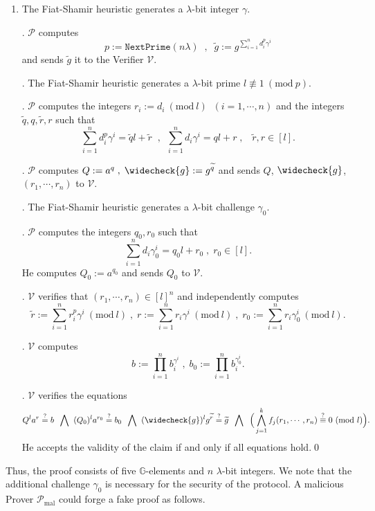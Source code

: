\documentclass[11pt, lettersize, notitlepage, leqno, footskip=0.6cm]{article}
\newcommand{\pl}{\prod\limits}
\newcommand{\slim}{\sum\limits}
\newcommand{\ttt}{\texttt}
\newcommand{\wti}{\widetilde}
\newcommand{\mc}{\mathcal}
\newcommand{\mb}{\mathbb}
\newcommand{\mr}{\mathrm}
\newcommand{\lam}{\lambda}
\newcommand{\weck}{\widecheck}
\newcommand{\mP}{\mc{P}}
\newcommand{\V}{\mc{V}}
\newcommand{\vs}{\vspace{-0.15cm}}
\newcommand{\noin}{\noindent}
\newcommand{\sta}{\stackrel{?}{=}}
\newcommand{\Mod}[1]{\ (\mathrm{mod}\ #1)}
\numberwithin{equation}{section}
\begin{document}
\begin{enumerate}[wide, labelwidth=!, labelindent=0pt]\vs \item The Fiat-Shamir heuristic generates a $\lam$-bit integer $\gamma$.

. $\mc{P}$ computes \vs $$p:= \ttt{NextPrime}(n\lam)\;\;,\;\;\wti{g} :=g^{\sum\limits_{i=1}^n d_i^{p}\gamma^i}$$ and sends $\wti{g}$ it to the Verifier $\mc{V}$.

. The Fiat-Shamir heuristic generates a $\lam$-bit prime $l\not\equiv 1\Mod{p}$.
 
. $\mc{P}$ computes the integers $r_i:=d_i\Mod{l}\;\; (i=1,\cdots, n)$ and the integers $\wti{q}, q, \wti{r}, r$ such that \vs $$\slim_{i=1}^n d_i^{p}\gamma^i = \wti{q}l+\wti{r}\;\;,\:\;\slim_{i=1}^n d_i\gamma^i = ql+r\;,\;\;\;\wti{r}, r\in [l] .$$

\noin 5. $\mP$ computes $Q:= a^q\;,\;\weck{g}:= g^{\wti{q}}$ and sends $Q$, $\weck{g}$, $(r_1,\cdots,r_n)$ to  $\V$. 

\noin 6. The Fiat-Shamir heuristic generates a $\lam$-bit challenge $\gamma_0$.

\noin 7. $\mP$ computes the integers $q_0, r_0$ such that \vs $$\slim_{i=1}^n d_i\gamma_0^i = q_0l+r_0\;,\;r_0\in[l] .$$ He computes $Q_0:= a^{q_{0}}$ and sends $Q_0$ to $\V$.

. $\mc{V}$ verifies that $(r_1,\cdots,r_n)\in [l]^n$ and independently computes \vs $$\wti{r}:= \slim_{i=1}^n r_i^{p}\gamma^i\Mod{l}\;,\;r:= \slim_{i=1}^n r_i\gamma^i\Mod{l}\;,\;r_0:= \slim_{i=1}^n r_i\gamma_0^i\Mod{l}.$$

\noin 9. $\V$ computes \vs $$b:= \pl_{i=1}^n b_i^{\gamma^i}\;,\;b_0:= \pl_{i=1}^n b_i^{\gamma_0^i}.$$

. $\mc{V}$ verifies the equations \vs $$ Q^{l} a^{r} \sta b \;\;\bigwedge\;\;(Q_0)^{l} a^{r_{0}} \sta b_0 \;\;\bigwedge\;\; (\weck{g})^lg^{\wti{r}} \stackrel{?}{=}\wti{g} \;\;\bigwedge\;\;\Big( \bigwedge\limits_{j=1}^k  f_j(r_1,\cdots,r_n) \stackrel{?}{\equiv} 0\Mod{l} \Big).$$ He accepts the validity of the claim if and only if all equations hold.\qed \end{enumerate}


\vspace{0.1cm}

Thus, the proof consists of five $\mb{G}$-elements and $n$ $\lam$-bit integers. We note that the additional challenge $\gamma_0$ is necessary for the security of the protocol. A malicious Prover $\mP_{\mr{mal}}$ could forge a fake proof as follows.
\end{document}

